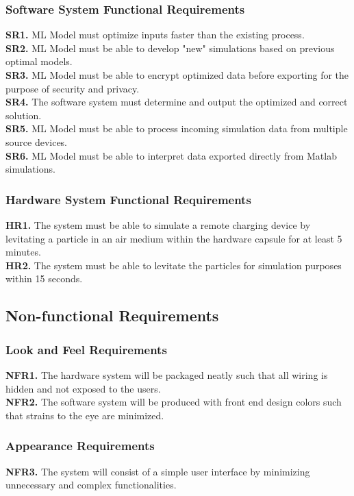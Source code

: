 \documentclass[12pt, titlepage]{article}
\begin{document}
\subsubsection{Software System Functional Requirements}
\textbf{SR1.} ML Model must optimize inputs faster than the existing process.\\
\textbf{SR2.} ML Model must be able to develop "new" simulations based on previous optimal models.\\
\textbf{SR3.} ML Model must be able to encrypt optimized data before exporting for the purpose of security and privacy.\\
\textbf{SR4.} The software system must determine and output the optimized and correct solution.\\
\textbf{SR5.} ML Model must be able to process incoming simulation data from multiple source devices.\\
\textbf{SR6.} ML Model must be able to interpret data exported directly from Matlab simulations.

\color{black}

\subsubsection{Hardware System Functional Requirements}
\textbf{HR1.} The system must be able to simulate a remote charging device by levitating a particle in an air medium within the hardware capsule for at least 5 minutes.\\
\textbf{HR2.} The system must be able to levitate the particles for simulation purposes within 15 seconds.\\

\subsection{Non-functional Requirements}
\subsubsection{Look and Feel Requirements}
\textbf{NFR1.} The hardware system will be packaged neatly such that all wiring is hidden and not exposed to the users.\\
\textbf{NFR2.} The software system will be produced with front end design colors such that strains to the eye are minimized.
\subsubsection{Appearance Requirements}
\textbf{NFR3.} The system will consist of a simple user interface by minimizing unnecessary and complex functionalities.
\end{document}
